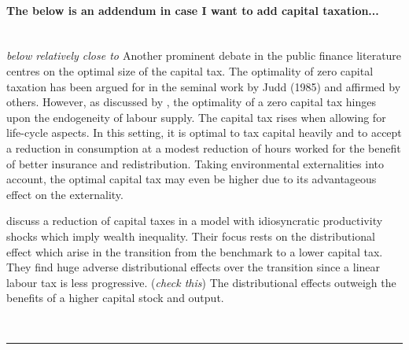 \paragraph{The below is an addendum in case I want to add capital taxation...} \ 
\\

\noindent
\textit{below relatively close to \cite{Conesa2009TaxingAll}} 
Another prominent debate in the public finance literature centres on the optimal size of the capital tax. The optimality of zero capital taxation has been argued for in the seminal work by Judd (1985) and affirmed by others.  However, as discussed by \cite{Conesa2009TaxingAll}, the optimality of a zero capital tax hinges upon the endogeneity of labour supply. The capital tax rises when allowing for life-cycle aspects. In this setting, it is optimal to tax capital heavily and to accept a reduction in consumption at a modest reduction of hours worked for the benefit of better insurance and redistribution. Taking environmental externalities into account, the optimal capital tax may even be higher due to its advantageous effect on the externality.

\cite{Domeij2004OnTaxes} discuss a reduction of capital taxes in a model with idiosyncratic productivity shocks which imply  wealth inequality. Their focus rests on the distributional effect which arise in the transition from the benchmark to a lower capital tax. They find huge adverse distributional effects over the transition since a linear labour tax is less progressive.  (\textit{check this}) The distributional effects outweigh the benefits of a higher capital stock and output. 

\\

\noindent\rule[1ex]{\textwidth}{1pt}

